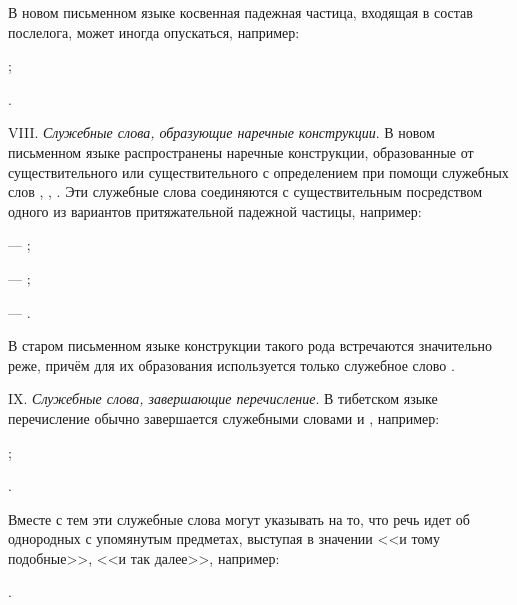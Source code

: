 В новом письменном языке косвенная падежная частица, входящая в состав послелога, может иногда опускаться, например:
\begin{prfsample}
	\item {};
	\item {}.
\end{prfsample}

VIII. \emph{Служебные слова, образующие наречные конструкции}. В новом письменном языке распространены наречные конструкции, образованные от существительного или существительного с определением при помощи служебных слов , , .
Эти служебные слова соединяются с существительным посредством одного из вариантов притяжательной падежной частицы, например:
\begin{prfsample}
	\item {} --- ;
	\item {} --- ;
	\item {} --- .
\end{prfsample}
В старом письменном языке конструкции такого рода встречаются значительно реже, причём для их образования используется только служебное слово .

IX.	\emph{Служебные слова, завершающие перечисление}. В тибетском языке перечисление обычно завершается служебными словами  и , например:
\begin{prfsample}
	\item {};
	\item {}.
\end{prfsample}
Вместе с тем эти служебные слова могут указывать на то, что речь идет об однородных с упомянутым предметах, выступая в значении <<и тому подобные>>, <<и так далее>>, например:
\begin{prfsample}
	\item {}.
\end{prfsample}

